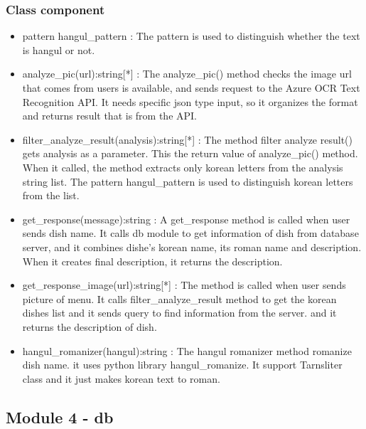 \subsubsection {Class component}

\begin{itemize}

\item pattern hangul\_pattern : The pattern is used to distinguish whether the text is hangul or not. \newline
\item analyze\_pic(url):string[*] : The analyze\_pic() method checks the image url that comes from users is available, and sends request to the Azure OCR Text Recognition API. It needs specific json type input, so it organizes the format and returns result that is from the API. \newline
\item filter\_analyze\_result(analysis):string[*] : The method filter analyze result() gets analysis as a parameter. This the return value of analyze\_pic() method. When it called, the method extracts only korean letters from the analysis string list. The pattern hangul\_pattern is used to distinguish korean letters from the list. \newline
\item get\_response(message):string : A get\_response method is called when user sends dish name. It calls db module to get information of dish from database server, and it combines dishe's korean name, its roman name and description. When it creates final description, it returns the description. \newline
\item get\_response\_image(url):string[*] : The method is called when user sends picture of menu. It calls filter\_analyze\_result method to get the korean dishes list and it sends query to find information from the server. and it returns the description of dish. \newline
\item hangul\_romanizer(hangul):string : The hangul romanizer method romanize dish name. it uses python library hangul\_romanize. It support Tarnsliter class and it just makes korean text to roman. 
\end{itemize} 

\FloatBarrier

\subsection{Module 4 - db}


